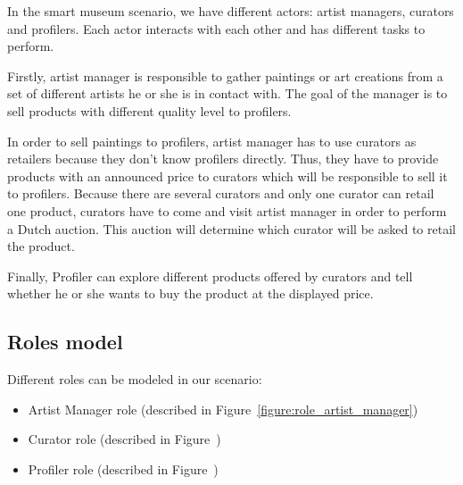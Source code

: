 \documentclass[a4paper,11pt]{report}
\begin{document}
  In the smart museum scenario, we have different actors: artist managers, curators 
  and profilers. Each actor interacts with each other and has different tasks to 
  perform.
  
  Firstly, artist manager is responsible to gather paintings or art creations 
  from a set of different artists he or she is in contact with. The goal of the manager 
  is to sell products with different quality level to profilers.
  
  In order to sell paintings to profilers, artist manager has to use curators as retailers 
  because they don't know profilers directly. Thus, they have to provide products with an 
  announced price to curators which will be responsible to sell it to profilers. Because there 
  are several curators and only one curator can retail one product, curators have to come and 
  visit artist manager in order to perform a Dutch auction. This auction will determine which 
  curator will be asked to retail the product.
  
  Finally, Profiler can explore different products offered by curators and tell whether he or 
  she wants to buy the product at the displayed price.
  
  
  \subsection{Roles model}
  
  Different roles can be modeled in our scenario:
  \begin{itemize}
   \item Artist Manager role (described in Figure~\ref{figure:role_artist_manager})
   \item Curator role (described in Figure~) %
   \item Profiler role (described in Figure~) %
  \end{itemize}
\end{document}
